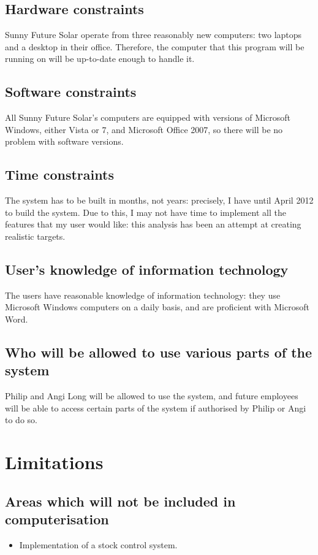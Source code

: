 		\subsection{Hardware constraints}
Sunny Future Solar operate from three reasonably new computers: two laptops and a desktop in their office.  Therefore, the computer that this program will be running on will be up-to-date enough to handle it.
		\subsection{Software constraints}
All Sunny Future Solar's computers are equipped with versions of Microsoft Windows, either Vista or 7, and Microsoft Office 2007, so there will be no problem with software versions.
		\subsection{Time constraints}
The system has to be built in months, not years: precisely, I have until April 2012 to build the system.  Due to this, I may not have time to implement all the features that my user would like: this analysis has been an attempt at creating realistic targets. 
		\subsection{User's knowledge of information technology}
The users have reasonable knowledge of information technology: they use Microsoft Windows computers on a daily basis, and are proficient with Microsoft Word.
		\subsection{Who will be allowed to use various parts of the system}
Philip and Angi Long will be allowed to use the system, and future employees will be able to access certain parts of the system if authorised by Philip or Angi to do so.
	\section{Limitations}
		\subsection{Areas which will not be included in computerisation}
		\begin{itemize}
			\item{Implementation of a stock control system.}
		\end{itemize}
